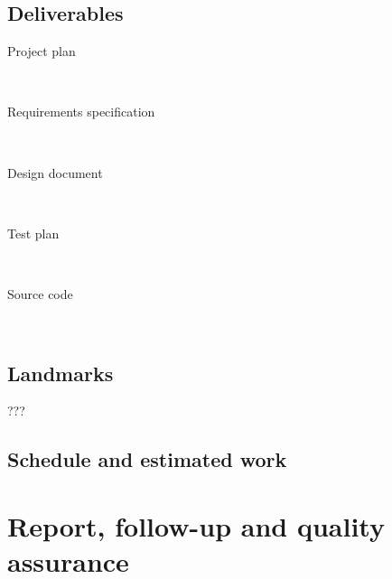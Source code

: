 \documentclass[12pt,titlepage]{article}
\begin{document}
\subsection{Deliverables}

\begin{description}
	\item[Project plan] \hfill \\
	\item[Requirements specification] \hfill \\
	\item[Design document] \hfill \\
	\item[Test plan] \hfill \\
	\item[Source code] \hfill \\
\end{description}

\subsection{Landmarks}

???

\subsection{Schedule and estimated work}


\section{Report, follow-up and quality assurance}


%
%
%
%
\end{document}
